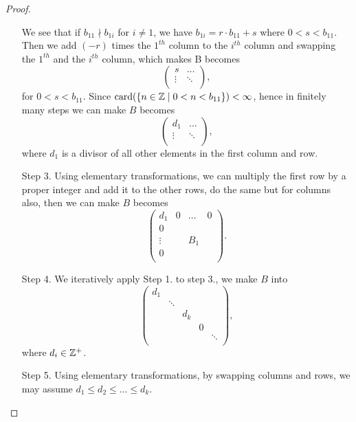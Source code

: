 \begin{proof}
\begin{enumerate}
			\par We see that if \(b_{11}\nmid b_{1i}\) for \(i \neq 1\), we have \(b_{1i} = r\cdot b_{11} + s\) where \(0 < s < b_{11}\). Then we add \((-r)\) times the
			\(1^{th} \) column to the \(i^{th} \) column and swapping the \(1^{th} \) and the \(i^{th} \) column, which makes B becomes
			\[
				\begin{pmatrix}
					s      & \ldots \\
					\vdots & \ddots \\
				\end{pmatrix},
			\]
			for \(0 < s< b_{11} \). Since \(\mathrm{card}(\left\{n\in \mathbb{\MakeUppercase{z}} \mid 0 < n <b_{11} \right\}) < \infty \), hence in finitely many steps we can make
			\(B\) becomes
			\[
				\begin{pmatrix}
					d_1    & \ldots \\
					\vdots & \ddots \\
				\end{pmatrix},
			\]
			where \(d_1\) is a divisor of all other elements in the first column and row.
		\item[Step 3.] Using elementary transformations, we can multiply the first row by a proper integer and add it to the other rows, do the same but for columns also, then we can
			make \(B\) becomes
			\[
				\begin{pmatrix}
					d_1    & 0 & \ldots & 0 \\
					0      &   &        &   \\
					\vdots &   & B_1    &   \\
					0      &   &        &   \\
				\end{pmatrix}.
			\]
		\item[Step 4.] We iteratively apply Step 1. to step 3., we make \(B\) into
			\[
				\begin{pmatrix}
					d_1 &        &       &   &        \\
					    & \ddots &       &   &        \\
					    &        & d_{k} &   &        \\
					    &        &       & 0 &        \\
					    &        &       &   & \ddots \\
				\end{pmatrix},
			\]
			where \(d_{i} \in \mathbb{\MakeUppercase{z}} ^+\).
		\item[Step 5.] Using elementary transformations, by swapping columns and rows, we may assume \(d_1 \leq d_2 \leq \ldots \leq  d_{k}  \).

\end{enumerate}
\end{proof}
